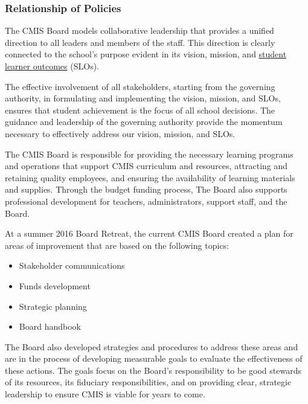 \subsubsection{Relationship of Policies}



\begin{findings}
The CMIS Board models collaborative leadership that provides a unified direction to all leaders and members of the staff. This direction is clearly connected to the school’s purpose evident in its vision, mission, and \href{https://docs.google.com/document/d/1bIbV9pgGz2vpXYJdnRzL_Od5PS35egy7lgBOBuszgD4/edit}{student learner outcomes} (SLOs).

The effective involvement of all stakeholders, starting from the governing authority, in formulating and implementing the vision, mission, and SLOs, ensures that student achievement is the focus of all school decisions. The guidance and leadership of the governing authority provide the momentum necessary to effectively address our vision, mission, and SLOs.

The CMIS Board is responsible for providing the necessary learning programs and operations that support CMIS curriculum and resources, attracting and retaining quality employees, and ensuring the availability of learning materials and supplies. Through the budget funding process, The Board also supports professional development for teachers, administrators, support staff, and the Board.

At a summer 2016 Board Retreat, the current CMIS Board created a plan for areas of improvement that are based on the following topics: 

\begin{itemize}
\item Stakeholder communications
\item Funds development
\item Strategic planning
\item Board handbook
\end{itemize}

The Board also developed strategies and procedures to address these areas and are in the process of developing measurable goals to evaluate the effectiveness of these actions. The goals focus on the Board’s responsibility to be good stewards of its resources, its fiduciary responsibilities, and on providing clear, strategic leadership to ensure CMIS is viable for years to come.


\end{findings}
